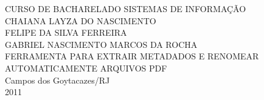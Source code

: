 \begin{titlepage}
 \begin{figure}[ht]
 \centering
 \end{figure}
 \begin{center}
   {\large CURSO DE BACHARELADO SISTEMAS DE INFORMAÇÃO} \\ [3.5cm]
   {\large CHAIANA LAYZA DO NASCIMENTO} \\
   {\large FELIPE DA SILVA FERREIRA} \\
   {\large GABRIEL NASCIMENTO MARCOS DA ROCHA} \\ [4cm]
   {\large FERRAMENTA PARA EXTRAIR METADADOS E RENOMEAR AUTOMATICAMENTE ARQUIVOS PDF}\\ [2cm]   
   \vfill
   {\large Campos dos Goytacazes/RJ} \\
   {\large 2011}
 \end{center}
\end{titlepage}
